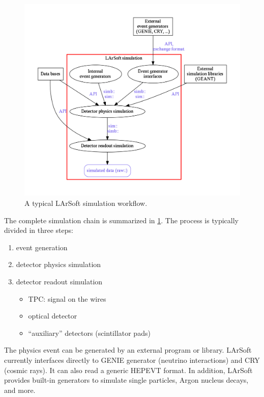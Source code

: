 \begin{figure}[htbp]
  \centering
  \includegraphics[width=\textwidth]{figures/LArSoftSimulationGraph.pdf}
  \caption{\label{fig:LArSoftSimulation}A typical LArSoft simulation workflow.}
\end{figure}
The complete simulation chain is summarized in \cref{fig:LArSoftSimulation}.
The process is typically divided in three steps:
\begin{enumerate}
   \item event generation
   \item detector physics simulation
   \item detector readout simulation
      \begin{itemize}
         \item TPC: signal on the wires
         \item optical detector
         \item ``auxiliary'' detectors (\eg scintillator pads)
      \end{itemize}
\end{enumerate}

The physics event can be generated by an external program or library.
LArSoft currently interfaces directly to GENIE generator (neutrino interactions)
and CRY (cosmic rays). It can also read a generic HEPEVT\cite{HEPEVT} format.
In addition, LArSoft provides built-in generators to simulate single particles,
Argon nucleus decays, and more.

